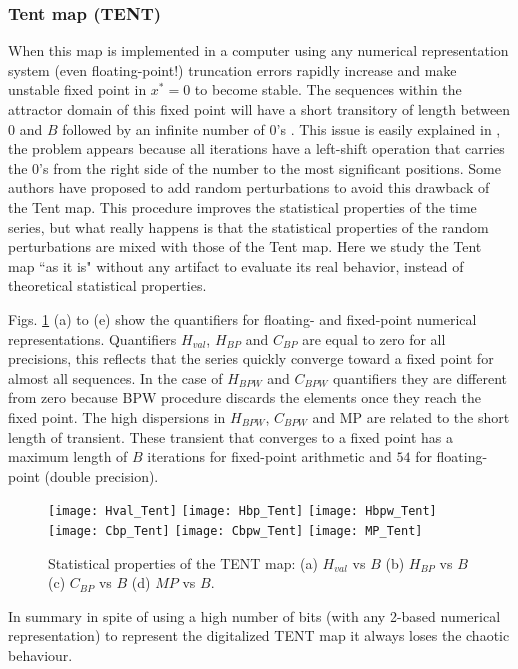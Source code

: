 \subsubsection{Tent map (TENT)} \label{sssec:tent}

When this map is implemented in a computer using any numerical representation system (even floating-point!) truncation errors rapidly increase and make unstable fixed point in $x^*=0$ to become stable.
The sequences within the attractor domain of this fixed point will have a short transitory of length between $0$ and $B$ followed by an infinite number of $0$'s \cite{Jessa2002,Callegari}.
This issue is easily explained in \cite{Li2004}, the problem appears because all iterations have a left-shift operation that carries the $0$'s from the right side of the number to the most significant positions.
Some authors \cite{buscar} have proposed to add random perturbations to avoid this drawback of the Tent map.
This procedure improves the statistical properties of the time series, but what really happens is that the statistical properties of the random perturbations are mixed with those of the Tent map.
Here we study the Tent map ``as it is" without any artifact to evaluate its real behavior, instead of theoretical statistical properties. 

Figs. \ref{fig:TENT_QuantiB} (a) to (e) show the quantifiers for floating- and fixed-point numerical representations.
Quantifiers $H_{val}$, $H_{BP}$ and $C_{BP}$ are equal to zero for all precisions, this reflects that the series quickly converge toward a fixed point for almost all sequences.
In the case of $H_{BPW}$ and $C_{BPW}$ quantifiers they are different from zero because BPW procedure discards the elements once they reach the fixed point.
The high dispersions in $H_{BPW}$, $C_{BPW}$ and MP are related to the short length of transient.
These transient that converges to a fixed point has a maximum length of $B$ iterations for fixed-point arithmetic and $54$ for floating-point (double precision).

\begin{figure}
	\texttt{[image: Hval\_Tent]}
	\texttt{[image: Hbp\_Tent]}
	\texttt{[image: Hbpw\_Tent]}
	\texttt{[image: Cbp\_Tent]}
	\texttt{[image: Cbpw\_Tent]}
	\texttt{[image: MP\_Tent]}
	\caption{Statistical properties of the TENT map: (a) $H_{val}$ vs $B$ (b) $H_{BP}$ vs $B$ (c) $C_{BP}$ vs $B$ (d) $MP$ vs $B$.}
	\label{fig:TENT_QuantiB}
\end{figure}

In summary in spite of using a high number of bits (with any 2-based numerical representation) to represent the digitalized TENT map it always loses the chaotic behaviour.
